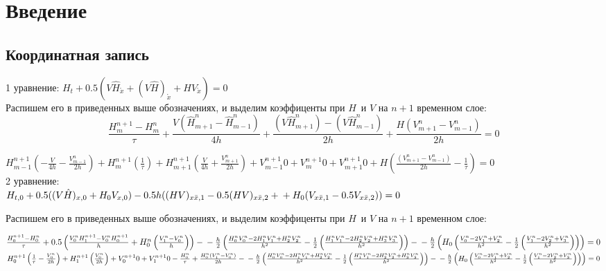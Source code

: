 \section{Введение}
\subsection{Координатная запись}

1 уравнение:
$
H_t + 0.5(V\hat{H}_{\mathring{x}} + (V\hat{H})_{\mathring{x}} + HV_{\mathring{x}}) = 0
$\\
Распишем его в приведенных выше обозначениях, и выделим коэффиценты при $H\,$ и $V$ на $n + 1$ временном слое:
$$
\frac{H^{n+1}_m - H^n_m}{\tau} + \frac{V(\hat{H}_{m+1}^n - \hat{H}_{m-1}^n)}{4h} + \frac{(V\hat{H}^n_{m+1}) - (V\hat{H}^n_{m-1})}{2h} + \frac{H(V^n_{m+1} - V^n_{m-1})}{2h} = 0
$$

$
H_{m-1}^{n+1}\left(-\frac{V}{4h} - \frac{V_{m-1}^n}{2h}\right) + H_{m}^{n+1}\left(\frac{1}{\tau}\right) + H_{m+1}^{n+1}\left(\frac{V}{4h} +\frac{V_{m+1}^n}{2h}\right) + V_{m-1}^{n+1}0 + V_{m}^{n+1}0 + V_{m+1}^{n+1}0 + H \left(\frac{(V_{m+1}^n - V_{m-1}^n)}{2h} - \frac{1}{\tau}\right)= 0
$\\

2 уравнение:\\
$
H_{t,0} + 0.5((V\hat{H})_{x,0} + H_0V_{x,0}) - 0.5h((HV)_{x\bar{x},1} - 0.5(HV)_{x\bar{x},2} + \\
+ H_0(V_{x\bar{x},1} - 0.5 V_{x\bar{x},2})) = 0
$

Распишем его в приведенных выше обозначениях, и выделим коэффиценты при $H\,$ и $V$ на $n + 1$ временном слое:

$
\frac{H_0^{n+1} - H_0^n}{\tau} + 0.5\left(\frac{V_0^{n}H_1^{n+1} - V_0^nH_0^{n+1}}{h} + H_0^n\left(\frac{V_1^n-V_0^n}{h}\right)\right) - \\
- \frac{h}{2}\left(\frac{H_0^nV_0^n-2H_1^nV_1^n + H_2^nV_2^n}{h^2} -\frac{1}{2}\left(\frac{H_1^nV_1^n-2H_2^nV_2^n + H_3^nV_3^n}{h^2}\right)\right) -\\
- \frac{h}{2}\left(H_0\left(\frac{V_0^n-2V_1^n+V_2^n}{h^2} -\frac{1}{2}\left(\frac{V_1^n - 2V_2^n + V_3^n}{h^2}\right)\right)\right) = 0
$\\

$
H_0^{n+1}\left(\frac{1}{\tau} - \frac{V_0^n}{2h}\right) + H_1^{n+1}\left(\frac{V_0^n}{2h}\right) + V_0^{n+1}0 + V_1^{n+1}0 -\frac{H_0^n}{\tau} + \frac{H_0^n(V_1^n-V_0^n)}{2h} - \\
- \frac{h}{2}\left(\frac{H_0^nV_0^n-2H_1^nV_1^n + H_2^nV_2^n}{h^2} -\frac{1}{2}\left(\frac{H_1^nV_1^n-2H_2^nV_2^n + H_3^nV_3^n}{h^2}\right)\right) -\\
- \frac{h}{2}\left(H_0\left(\frac{V_0^n-2V_1^n+V_2^n}{h^2} -\frac{1}{2}\left(\frac{V_1^n - 2V_2^n + V_3^n}{h^2}\right)\right)\right) = 0
$\\

